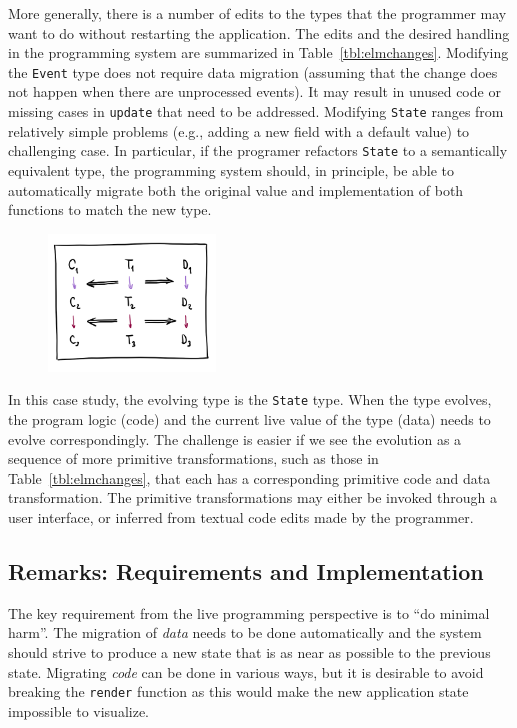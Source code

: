 \documentclass[english,submission]{programming}
\DeclareRobustCommand{\frameworkbox}[2][gray!15]{
\begin{tcolorbox}[breakable,left=3pt,right=3pt,top=3pt,bottom=3pt,colback=#1,colframe=#1,parbox=false,
  width=\dimexpr\textwidth\relax,enlarge left by=0mm,boxsep=5pt,arc=0pt,enlarge top by=0.5em,%
  outer arc=0pt]\setlength{\parskip}{0.5em}#2
\end{tcolorbox}}
\newcommand{\frameworkboxtitle}[1]{\setlength{\parindent}{0em}{\firamedium #1.}\quad}
\begin{document}
More generally, there is a number of edits to the types that the programmer may want to do
without restarting the application. The edits and the desired handling in the programming
system are summarized in Table~\ref{tbl:elmchanges}. Modifying the \texttt{Event} type does not
require data migration (assuming that the change does not happen when there are unprocessed
events). It may result in unused code or missing cases in \texttt{update} that need to be addressed.
Modifying \texttt{State} ranges from relatively simple problems (e.g., adding a new field with a
default value) to challenging case. In particular, if the programer refactors \texttt{State} to a
semantically equivalent type, the programming system should, in principle, be able to automatically
migrate both the original value and implementation of both functions to match the new type.

\frameworkbox{
\begin{figure}
\vspace{0em}
\includegraphics[width=12em]{figures/arr-steps.png}
\vspace{0em}
\end{figure}
\frameworkboxtitle{Primitive Type Transformations}
In this case study, the evolving type is the \texttt{State} type. When the type evolves,
the program logic (code) and the current live value of the type (data) needs to evolve
correspondingly. The challenge is easier if we see the evolution as a sequence of more primitive
transformations, such as those in Table~\ref{tbl:elmchanges}, that each has a corresponding
primitive code and data transformation. The primitive transformations may either be invoked
through a user interface, or inferred from textual code edits made by the programmer.
}

\subsection*{Remarks: Requirements and Implementation}
The key requirement from the live programming perspective is to ``do minimal harm''.
The migration of \emph{data} needs to be done automatically and the system should strive
to produce a new state that is as near as possible to the previous state. Migrating
\emph{code} can be done in various ways,
but it is desirable to avoid breaking the \texttt{render} function as this would make the
new application state impossible to visualize.
\end{document}
